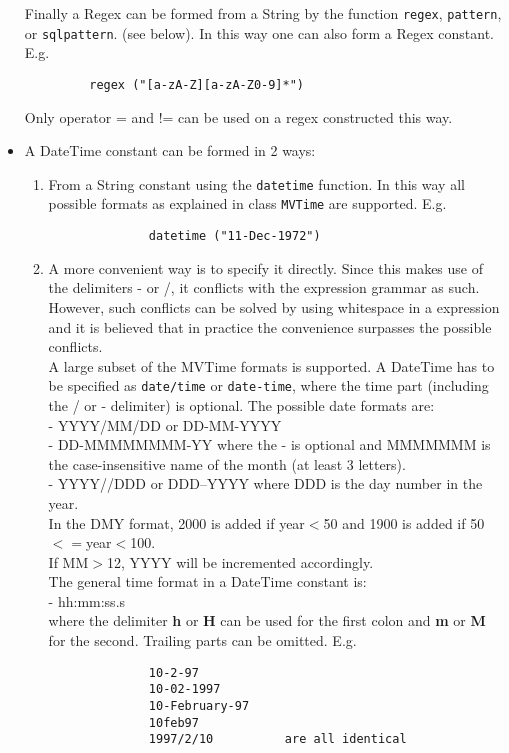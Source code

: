\begin{itemize}
       Finally a Regex can be formed from a String
       by the function \texttt{regex}, \texttt{pattern}, or
       \texttt{sqlpattern}. (see below). 
       In this way one can also form a Regex constant. E.g.
       \begin{verbatim}
         regex ("[a-zA-Z][a-zA-Z0-9]*")
       \end{verbatim}
       Only operator = and != can be used on a regex constructed this way.
  \item A DateTime constant can be formed in 2 ways:
       \begin{enumerate}
         \item From a String constant using the \texttt{datetime} function.
              In this way all possible formats as explained in class
              \texttt{MVTime} are supported. E.g.
              \begin{verbatim}
              datetime ("11-Dec-1972")
              \end{verbatim}
         \item A more convenient way is to specify it directly. Since this
              makes use of the delimiters - or /, it conflicts with the
              expression grammar as such. However, such conflicts can be
              solved by using whitespace in a expression and it is believed
              that in practice the convenience surpasses the possible
              conflicts.
              \\A large subset of the MVTime formats is supported.
              A DateTime has to be specified as \texttt{date/time}
              or \texttt{date-time}, where the time part (including
              the / or - delimiter) is optional.
              The possible date formats are:
              \\- YYYY/MM/DD or DD-MM-YYYY
              \\- DD-MMMMMMMM-YY where the - is optional and MMMMMMM is the
              case-insensitive name of the month (at least 3 letters).
              \\- YYYY//DDD or DDD--YYYY where DDD is the day number in
              the year.
              \\In the DMY format, 2000 is added if year$<$50 and
              1900 is added if 50$<=$year$<$100.
              \\If MM$>$12, YYYY will be incremented accordingly.
              \\The general time format in a DateTime constant is:
              \\- hh:mm:ss.s
              \\where the delimiter \textbf{h} or \textbf{H} can be used
              for the first colon and \textbf{m} or \textbf{M} for the second.
              Trailing parts can be omitted. E.g.
              \begin{verbatim}
              10-2-97
              10-02-1997
              10-February-97
              10feb97
              1997/2/10          are all identical


\end{verbatim}
\end{enumerate}
\end{itemize}
